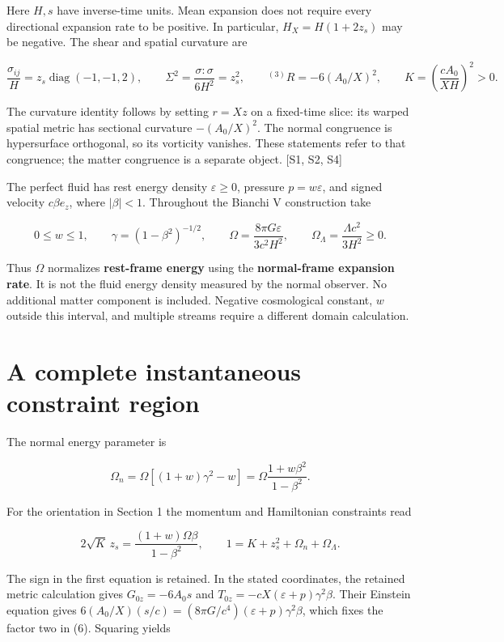 \documentclass[aps,prd,reprint,onecolumn,nofootinbib]{revtex4-2}
\begin{document}
Here \(H,s\) have inverse-time units. Mean expansion does not require every directional expansion rate to be positive. In particular, \(H_X=H(1+2z_s)\) may be negative. The shear and spatial curvature are

\[
 \frac{\sigma_{ij}}{H}=z_s\operatorname{diag}(-1,-1,2),
 \qquad \Sigma^2=\frac{\sigma:\sigma}{6H^2}=z_s^2,
 \qquad {}^{(3)}R=-6(A_0/X)^2,
 \qquad K=\left(\frac{cA_0}{XH}\right)^2>0.
 \tag{3}
\]

The curvature identity follows by setting \(r=Xz\) on a fixed-time slice: its warped spatial metric has sectional curvature \(-(A_0/X)^2\). The normal congruence is hypersurface orthogonal, so its vorticity vanishes. These statements refer to that congruence; the matter congruence is a separate object. {[}S1, S2, S4{]}

The perfect fluid has rest energy density \(\varepsilon\ge 0\), pressure \(p=w\varepsilon\), and signed velocity \(c\beta e_z\), where \(|\beta|<1\). Throughout the Bianchi V construction take

\[
 0\le w\le1,\qquad
 \gamma=(1-\beta^2)^{-1/2},\qquad
 \Omega=\frac{8\pi G\varepsilon}{3c^2H^2},\qquad
 \Omega_\Lambda=\frac{\Lambda c^2}{3H^2}\ge0.
 \tag{4}
\]

Thus \(\Omega\) normalizes \textbf{rest-frame energy} using the \textbf{normal-frame expansion rate}. It is not the fluid energy density measured by the normal observer. No additional matter component is included. Negative cosmological constant, \(w\) outside this interval, and multiple streams require a different domain calculation.

\hypertarget{a-complete-instantaneous-constraint-region}{%
\section{A complete instantaneous constraint region}\label{a-complete-instantaneous-constraint-region}}

The normal energy parameter is

\[
 \Omega_n=\Omega[(1+w)\gamma^2-w]
         =\Omega\frac{1+w\beta^2}{1-\beta^2}.
 \tag{5}
\]

For the orientation in Section 1 the momentum and Hamiltonian constraints read

\[
 2\sqrt K\,z_s=\frac{(1+w)\Omega\beta}{1-\beta^2},
 \qquad
 1=K+z_s^2+\Omega_n+\Omega_\Lambda.
 \tag{6}
\]

The sign in the first equation is retained. In the stated coordinates, the retained metric calculation gives \(G_{0z}=-6A_0s\) and \(T_{0z}=-cX(\varepsilon+p)\gamma^2\beta\). Their Einstein equation gives \(6(A_0/X)(s/c)=(8\pi G/c^4)(\varepsilon+p)\gamma^2\beta\), which fixes the factor two in (6). Squaring yields
\end{document}
